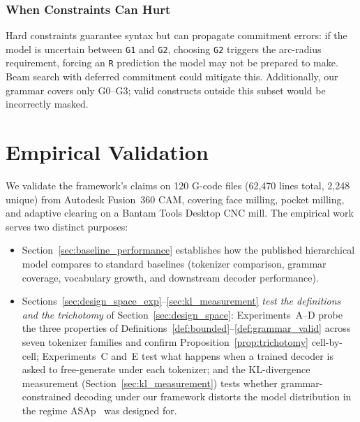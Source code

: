 \documentclass[11pt]{article}
\begin{document}
\subsubsection{When Constraints Can Hurt}

Hard constraints guarantee syntax but can propagate commitment errors: if the model is uncertain between \texttt{G1} and \texttt{G2}, choosing \texttt{G2} triggers the arc-radius requirement, forcing an \texttt{R} prediction the model may not be prepared to make. Beam search with deferred commitment could mitigate this. Additionally, our grammar covers only G0--G3; valid constructs outside this subset would be incorrectly masked.

\section{Empirical Validation}
\label{sec:empirical}

We validate the framework's claims on 120 G-code files (62{,}470 lines total, 2{,}248 unique) from Autodesk Fusion~360 CAM, covering face milling, pocket milling, and adaptive clearing on a Bantam Tools Desktop CNC mill. The empirical work serves two distinct purposes:
\begin{itemize}[leftmargin=*, nosep]
    \item Section~\ref{sec:baseline_performance} establishes how the published hierarchical model compares to standard baselines (tokenizer comparison, grammar coverage, vocabulary growth, and downstream decoder performance).
    \item Sections~\ref{sec:design_space_exp}--\ref{sec:kl_measurement} \emph{test the definitions and the trichotomy} of Section~\ref{sec:design_space}: Experiments~A--D probe the three properties of Definitions~\ref{def:bounded}--\ref{def:grammar_valid} across seven tokenizer families and confirm Proposition~\ref{prop:trichotomy} cell-by-cell; Experiments~C and~E test what happens when a trained decoder is asked to free-generate under each tokenizer; and the KL-divergence measurement (Section~\ref{sec:kl_measurement}) tests whether grammar-constrained decoding under our framework distorts the model distribution in the regime ASAp~\cite{grammar_aligned} was designed for.
\end{itemize}
\end{document}
